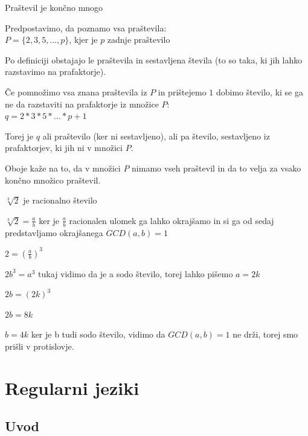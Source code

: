 \documentclass[10pt,a4paper,oneside]{book}
\begin{document}
\begin{primeri}
\item Praštevil je končno mnogo
	\begin{items}
	\item Predpostavimo, da poznamo vsa praštevila:\\
		$P = \{2,3,5,...,p\}$, kjer je $p$ zadnje praštevilo 
	\item Po definiciji obstajajo le praštevila in sestavljena števila (to so taka, ki jih lahko razstavimo na prafaktorje). 
	\item Če pomnožimo vsa znana praštevila iz $P$ in prištejemo $1$ dobimo število, ki se ga ne da razstaviti na prafaktorje iz množice $P$:\\
		$q = 2 * 3 * 5 * ... * p + 1$
	\item Torej je $q$ ali praštevilo (ker ni sestavljeno), ali pa število, sestavljeno iz prafaktorjev, ki jih ni v množici $P$.
	\item Oboje kaže na to, da v množici $P$ nimamo vseh praštevil in da to velja za vsako končno množico praštevil.
	\end{items}
\item $\sqrt[3]{2}$ je racionalno število 
	\begin{items}
	\item $\sqrt[3]{2} = \frac{a}{b}$ ker je $\frac{a}{b}$ racionalen ulomek ga lahko okrajšamo in si ga od sedaj predstavljamo okrajšanega $GCD(a,b)=1$
	\item $ 2 = \left( \frac{a}{b} \right)^3 $
	\item $2b^3 = a^3$ tukaj vidimo da je a sodo število, torej lahko pišemo $ a = 2k $
	\item $2b = \left( 2k\right)^3 $
	\item $2b = 8k $
	\item $b = 4k $ ker je b tudi sodo število, vidimo da $GCD(a,b)=1$ ne drži, torej smo prišli v protislovje.
	\end{items}
\end{primeri}

\pagebreak
\chapter{Regularni jeziki}

\section{Uvod}
\end{document}
